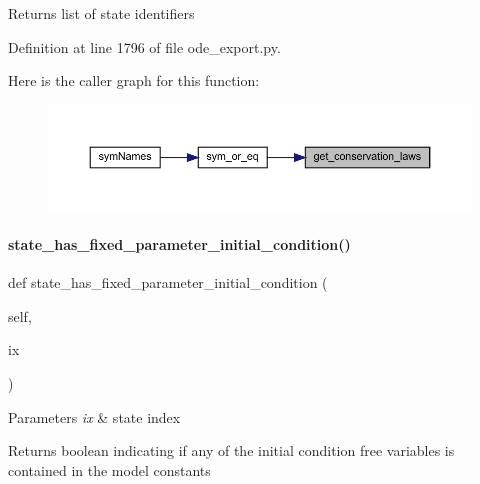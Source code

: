 \begin{DoxyReturn}{Returns}
list of state identifiers 
\end{DoxyReturn}


Definition at line 1796 of file ode\+\_\+export.\+py.

Here is the caller graph for this function\+:
\nopagebreak
\begin{figure}[H]
\begin{center}
\leavevmode
\includegraphics[width=350pt]{classamici_1_1ode__export_1_1_o_d_e_model_acbd9a0c022a1b5cbc09848bcac0de613_icgraph}
\end{center}
\end{figure}
\mbox{\label{classamici_1_1ode__export_1_1_o_d_e_model_a8b62416531adca2210c28230350b787e}} 
\paragraph{\texorpdfstring{state\_has\_fixed\_parameter\_initial\_condition()}{state\_has\_fixed\_parameter\_initial\_condition()}}
{\footnotesize\ttfamily def state\+\_\+has\+\_\+fixed\+\_\+parameter\+\_\+initial\+\_\+condition (\begin{DoxyParamCaption}\item[{}]{self,  }\item[{}]{ix }\end{DoxyParamCaption})}


\begin{DoxyParams}{Parameters}
{\em ix} & state index\\
\hline
\end{DoxyParams}
\begin{DoxyReturn}{Returns}
boolean indicating if any of the initial condition free variables is contained in the model constants 
\end{DoxyReturn}


